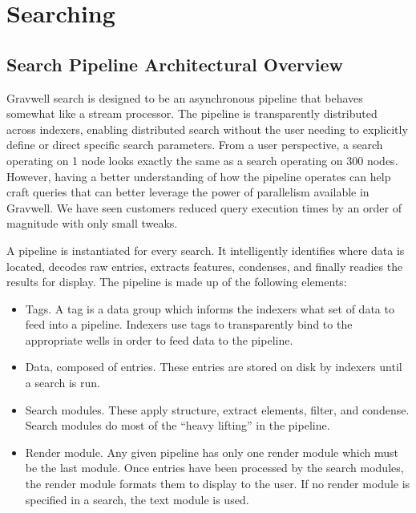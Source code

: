 \chapter{Searching}

\section{Search Pipeline Architectural Overview}
Gravwell search is designed to be an asynchronous pipeline that behaves
somewhat like a stream processor. The pipeline is transparently
distributed across indexers, enabling distributed search without the
user needing to explicitly define or direct specific search parameters.
From a user perspective, a search operating on 1 node looks exactly the
same as a search operating on 300 nodes. However, having a better
understanding of how the pipeline operates can help craft queries that
can better leverage the power of parallelism available in Gravwell. We
have seen customers reduced query execution times by an order of
magnitude with only small tweaks.

A pipeline is instantiated for every search. It intelligently
identifies where data is located, decodes raw entries, extracts
features, condenses, and finally readies the results for display. The
pipeline is made up of the following elements:

\begin{itemize}
\item
  Tags. A tag is a data group which informs the indexers what set of
  data to feed into a pipeline. Indexers use tags to transparently bind
  to the appropriate wells in order to feed data to the pipeline.
\item
  Data, composed of entries. These entries are stored on disk by
  indexers until a search is run.
\item
  Search modules. These apply structure, extract elements, filter, and
  condense. Search modules do most of the ``heavy lifting'' in the
  pipeline.
\item
  Render module. Any given pipeline has only one render module which
  must be the last module. Once entries have been processed by the
  search modules, the render module formats them to display to the user.
  If no render module is specified in a search, the text module is
  used.
\end{itemize}

